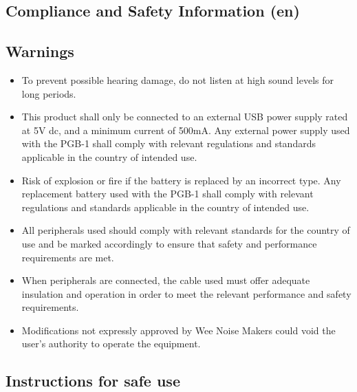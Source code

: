 \documentclass[8pt]{extarticle}
\begin{document}
\raggedright
\footnotesize

\justifying

\begin{multicols*}{3}
\setlength{\premulticols}{1pt}
\setlength{\postmulticols}{1pt}
\setlength{\multicolsep}{1pt}
\setlength{\columnsep}{2pt}

\section{Compliance and Safety Information (en)}

\subsection{Warnings}
\begin{itemize}
\item To prevent possible hearing damage, do not listen at high sound levels for long periods.
\item This product shall only be connected to an external USB power supply rated at 5V dc, and a minimum current of 500mA. Any external power supply used with the PGB-1 shall comply with relevant regulations and standards applicable in the country of intended use.
\item Risk of explosion or fire if the battery is replaced by an incorrect type. Any replacement battery used with the PGB-1 shall comply with relevant regulations and standards applicable in the country of intended use.
\item All peripherals used should comply with relevant standards for the country of use and be marked accordingly to ensure that safety and performance requirements are met.
\item When peripherals are connected, the cable used must offer adequate insulation and operation in order to meet the relevant performance and safety requirements.
\item Modifications not expressly approved by Wee Noise Makers could void the user’s authority to operate the equipment.
\end{itemize}

\subsection{Instructions for safe use}


\end{multicols*}
\end{document}
